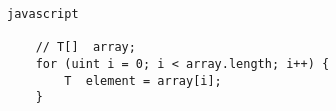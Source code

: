 \begin{lstlisting}[language=Solidity]
javascript

	// T[]  array;
	for (uint i = 0; i < array.length; i++) {
		T  element = array[i];
	}
\end{lstlisting}